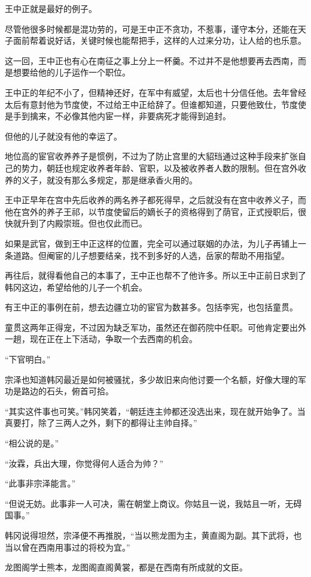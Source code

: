 王中正就是最好的例子。

尽管他很多时候都是混功劳的，可是王中正不贪功，不惹事，谨守本分，还能在天子面前帮着说好话，关键时候也能帮把手，这样的人过来分功，让人给的也乐意。

这一回，王中正也有心在南征之事上分上一杯羹。不过并不是他想要再去西南，而是想要给他的儿子运作一个职位。

王中正的年纪不小了，但精神还好，在军中有威望，太后也十分信任他。去年曾经太后有意封他为节度使，不过给王中正给辞了。但谁都知道，只要他致仕，节度使是手到擒来，不必像其他内宦一样，非要病死才能得到追封。

但他的儿子就没有他的幸运了。

地位高的宦官收养养子是惯例，不过为了防止宫里的大貂珰通过这种手段来扩张自己的势力，朝廷也规定收养者年龄、官职，以及被收养者人数的限制。但在宫外收养的义子，就没有那么多规定，那是继承香火用的。

王中正早年在宫中先后收养的两名养子都死得早，之后就没有在宫中收养义子，而他在宫外的养子王祁，以节度使留后的嫡长子的资格得到了荫官，正式授职后，很快就升到了内殿崇班。但也仅此而已。

如果是武官，做到王中正这样的位置，完全可以通过联姻的办法，为儿子再铺上一条道路。但阉宦的儿子想要结亲，找不到多好的人选，岳家的帮助不用指望。

再往后，就得看他自己的本事了，王中正也帮不了他许多。所以王中正前日求到了韩冈这边，希望给他的儿子一个机会。

有王中正的事例在前，想去边疆立功的宦官为数甚多。包括李宪，也包括童贯。

童贯这两年正得宠，不过因为缺乏军功，虽然还在御药院中任职。可他肯定要出外一趟，现在正在上下活动，争取一个去西南的机会。

“下官明白。”

宗泽也知道韩冈最近是如何被骚扰，多少故旧来向他讨要一个名额，好像大理的军功是路边的石头，俯首可拾。

“其实这件事也可笑。”韩冈笑着，“朝廷连主帅都还没选出来，现在就开始争了。当真要打，除了三两人之外，剩下的都得让主帅自择。”

“相公说的是。”

“汝霖，兵出大理，你觉得何人适合为帅？”

“此事非宗泽能言。”

“但说无妨。此事非一人可决，需在朝堂上商议。你姑且一说，我姑且一听，无碍国事。”

韩冈说得坦然，宗泽便不再推脱，“当以熊龙图为主，黄直阁为副。其下武将，也当以曾在西南用事过的将校为宜。”

龙图阁学士熊本，龙图阁直阁黄裳，都是在西南有所成就的文臣。

